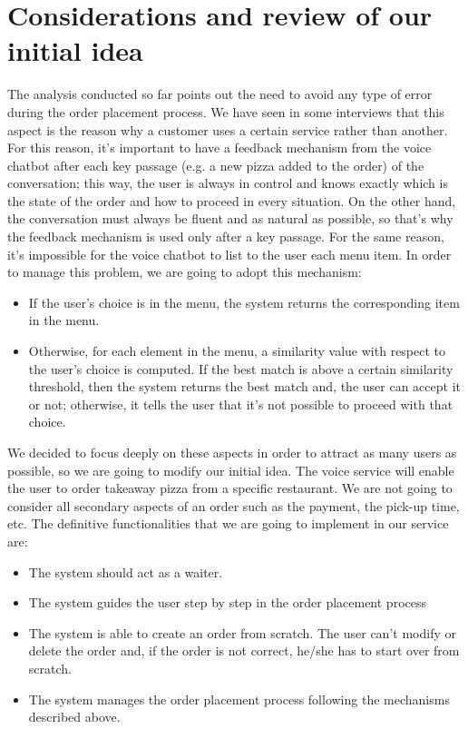\section{Considerations and review of our initial idea}

The analysis conducted so far points out the need to avoid any type of error during the order placement process. We have seen in some interviews that this aspect is the reason why a customer uses a certain service rather than another. For this reason, it's important to have a feedback mechanism from the voice chatbot after each key passage (e.g. a new pizza added to the order) of the conversation; this way, the user is always in control and knows exactly which is the state of the order and how to proceed in every situation. 
On the other hand, the conversation must always be fluent and as natural as possible, so that's why the feedback mechanism is used only after a key passage. For the same reason, it's impossible for the voice chatbot to list to the user each menu item. In order to manage this problem, we are going to adopt this mechanism:

\begin{itemize}

\item If the user's choice is in the menu, the system returns the corresponding item in the menu.
\item Otherwise, for each element in the menu, a similarity value with respect to the user's choice is computed. If the best match is above a certain similarity threshold, then the system returns the best match and, the user can accept it or not; otherwise, it tells the user that it's not possible to proceed with that choice. 

\end{itemize}

We decided to focus deeply on these aspects in order to attract as many users as possible, so we are going to modify our initial idea. The voice service will enable the user to order takeaway pizza from a specific restaurant. We are not going to consider all secondary aspects of an order such as the payment, the pick-up time, etc. The definitive functionalities that we are going to implement in our service are:

\begin{itemize}

\item The system should act as a waiter.
\item The system guides the user step by step in the order placement process
\item The system is able to create an order from scratch. The user can't modify or delete the order and, if the order is not correct, he/she has to start over from scratch.
\item The system manages the order placement process following the mechanisms described above.

\end{itemize}